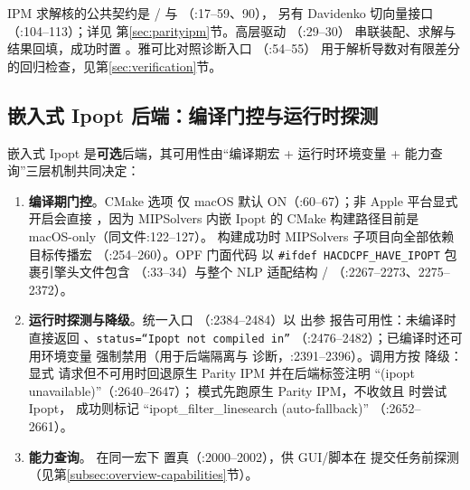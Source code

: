 IPM 求解核的公共契约是 / 与
（:17--59、90），
另有 Davidenko 切向量接口 （:104--113）；详见
第\ref{sec:parityipm}节。高层驱动 
（:29--30）
串联装配、求解与结果回填，成功时置
。雅可比对照诊断入口
（:54--55）
用于解析导数对有限差分的回归检查，见第\ref{sec:verification}节。

\subsection{嵌入式 Ipopt 后端：编译门控与运行时探测}\label{subsec:overview-ipopt}

嵌入式 Ipopt 是\textbf{可选}后端，其可用性由“编译期宏 + 运行时环境变量 +
能力查询”三层机制共同决定：

\begin{enumerate}
  \item \textbf{编译期门控}。CMake 选项 
        仅 macOS 默认 ON（:60--67）；非 Apple
        平台显式开启会直接 ，因为 MIPSolvers 内嵌
        Ipopt 的 CMake 构建路径目前是 macOS-only（同文件:122--127）。
        构建成功时 MIPSolvers 子项目向全部依赖目标传播宏
        （:254--260）。OPF 门面代码
        以 \texttt{\#ifdef HACDCPF\_HAVE\_IPOPT} 包裹引擎头文件包含
        （:33--34）与整个
        NLP 适配结构 /
        （:2267--2273、2275--2372）。
  \item \textbf{运行时探测与降级}。统一入口
        （:2384--2484）以
        出参  报告可用性：未编译时直接返回
        、\texttt{status=``Ipopt not compiled in''}
        （:2476--2482）；已编译时还可用环境变量
         强制禁用（用于后端隔离与
        诊断，:2391--2396）。调用方按  降级：显式
         请求但不可用时回退原生 Parity IPM 并在后端标签注明
        ``(ipopt unavailable)''（:2640--2647）； 模式先跑原生
        Parity IPM，不收敛且  时尝试 Ipopt，
        成功则标记 ``ipopt\_filter\_linesearch (auto-fallback)''
        （:2652--2661）。
  \item \textbf{能力查询}。 在同一宏下
        置真（:2000--2002），供 GUI/脚本在
        提交任务前探测（见第\ref{subsec:overview-capabilities}节）。
\end{enumerate}

